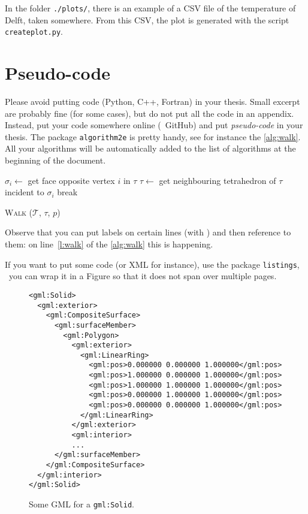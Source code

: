 In the folder \texttt{./plots/}, there is an example of a CSV file of the temperature of Delft, taken somewhere.
From this CSV, the plot is generated with the script \texttt{createplot.py}.


%
\section{Pseudo-code}%
\label{sec:code}

Please avoid putting code (Python, C++, Fortran) in your thesis.
Small excerpt are probably fine (for some cases), but do not put all the code in an appendix.
Instead, put your code somewhere online (\eg\ GitHub) and put \emph{pseudo-code} in your thesis.
The package \texttt{algorithm2e} is pretty handy, see for instance the \autoref{alg:walk}.
All your algorithms will be automatically added to the list of algorithms at the beginning of the document.
\begin{algorithm}
  \BlankLine
  {
    {
      $\sigma_i \leftarrow$ get face opposite vertex $i$ in $\tau$\;
      {
        $\tau \leftarrow$ get neighbouring tetrahedron of $\tau$ incident to $\sigma_i$\;
        break\;
      }
    }  
    {
    }
  }
  \caption[W\textsc{alk}]{W\textsc{alk} ($\mathcal{T}$, $\tau$, $p$)}%
\label{alg:walk}
\end{algorithm}
Observe that you can put labels on certain lines (with \texttt{\nllabel{}}) and then reference to them: on line~\ref{l:walk} of the \autoref{alg:walk} this is happening.

If you want to put some code (or XML for instance), use the package \texttt{listings}, \eg\ you can wrap it in a Figure so that it does not span over multiple pages.
\begin{figure}
\begin{footnotesize}
\begin{lstlisting}
<gml:Solid>
  <gml:exterior>
    <gml:CompositeSurface>
      <gml:surfaceMember>
        <gml:Polygon>
          <gml:exterior>
            <gml:LinearRing>
              <gml:pos>0.000000 0.000000 1.000000</gml:pos>
              <gml:pos>1.000000 0.000000 1.000000</gml:pos>
              <gml:pos>1.000000 1.000000 1.000000</gml:pos>
              <gml:pos>0.000000 1.000000 1.000000</gml:pos>
              <gml:pos>0.000000 0.000000 1.000000</gml:pos>
            </gml:LinearRing>
          </gml:exterior>
          <gml:interior>
          ...
      </gml:surfaceMember>
    </gml:CompositeSurface>
  </gml:interior>
</gml:Solid>
\end{lstlisting}
\end{footnotesize}
\caption{Some GML for a \texttt{gml:Solid}.}%
\label{fig:codegml}
\end{figure}

